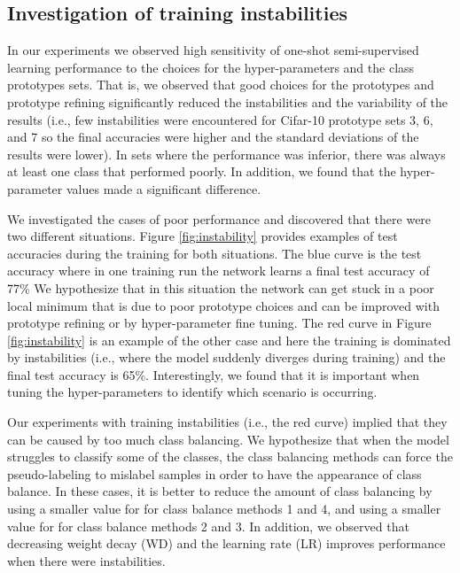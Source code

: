 \documentclass[final]{cvpr}
\newcommand{\OSSSL}{one-shot semi-supervised learning }
\newcommand{\HP}{hyper-parameter }
\newcommand{\HPs}{hyper-parameters }
\begin{document}
\subsection{Investigation of training instabilities}
\label{sec:expHPsensitivity}

In our experiments we observed high sensitivity of \OSSSL performance to the choices for the hyper-parameters and the class prototypes sets.
That is, we observed that good choices for the prototypes and prototype refining significantly reduced the instabilities and the variability of the results (i.e., few instabilities were encountered for Cifar-10 prototype sets 3, 6, and 7 so the final accuracies were higher and the standard deviations of the results were lower).
In sets where the performance was inferior, there was always at least one class that performed poorly.
In addition, we found that the \HP values made a significant difference.




We investigated the cases of poor performance and discovered that there were two different situations.
Figure \ref{fig:instability} provides examples of test accuracies during the training for both situations.
The blue curve is the test accuracy where in one training run the network learns a final test accuracy of 77\% 
We hypothesize that in this situation the network can get stuck in a poor local minimum that is due to poor prototype choices and can be improved with prototype refining or by \HP fine tuning.
The red curve in Figure \ref{fig:instability} is an example of the other case and here the training is dominated by instabilities (i.e., where the model suddenly diverges during training) and the final test accuracy is 65\%.
Interestingly, we found that it is important when tuning the \HPs to identify which scenario is occurring.


Our experiments with training instabilities (i.e., the red curve) implied that they can be caused by too much class balancing.
We hypothesize that when the model struggles to classify some of the classes, the class balancing methods can force the pseudo-labeling to mislabel samples in order to have the appearance of class balance.
In these cases, it is better to reduce the amount of class balancing by using a smaller value for  for class balance methods 1 and 4, and using a smaller value for  for class balance methods 2 and 3.
In addition, we observed that decreasing weight decay (WD) and the learning rate (LR) improves performance when there were instabilities.
\end{document}
